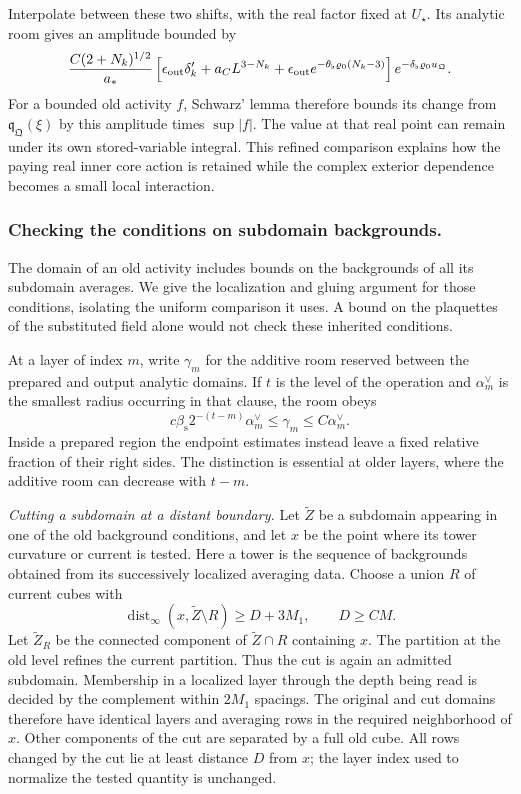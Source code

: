 \documentclass[11pt,letterpaper,reqno]{amsart}
\theoremstyle{definition}
\theoremstyle{remark}
\begin{document}
Interpolate between these two shifts, with the real
factor fixed at \(U_\star\). Its analytic room gives
an amplitude bounded by
\begin{equation}\label{eq:anchor-stored-comparison-amplitude}
 \frac{C(2+N_k)^{1/2}}{a_*}
 \left[
  \epsilon_{\rm out}\delta'_k+
  a_CL^{3-N_k}
  +\epsilon_{\rm out}e^{-\theta_\flat\varrho_0(N_k-3)}
 \right]e^{-\delta_\flat\varrho_0u_{\mathfrak Q}}.
\end{equation}
For a bounded old activity \(f\), Schwarz' lemma
therefore bounds its change from
\(\mathfrak q_{\mathfrak Q}(\xi)\) by this amplitude
times \(\sup|f|\). The value at that real point can
remain under its own stored-variable integral.
This refined comparison explains how the paying
real inner core action is retained while the
complex exterior dependence becomes a small local
interaction.

\subsubsection*{Checking the conditions on subdomain backgrounds.}

The domain of an old activity includes bounds on the backgrounds
of all its subdomain averages. We give the localization and gluing
argument for those conditions, isolating the uniform comparison it
uses. A bound on the plaquettes of the substituted field alone
would not check these inherited conditions.

At a layer of index $m$, write $\gamma_m$ for the additive room
reserved between the prepared and output analytic domains. If $t$
is the level of the operation and $\alpha_m^\vee$ is the smallest
radius occurring in that clause, the room obeys
\[
 c\beta_{\mathrm s}2^{-(t-m)}\alpha_m^\vee
                      \le\gamma_m\le C\alpha_m^\vee.
\]
Inside a prepared region the endpoint estimates instead leave a
fixed relative fraction of their right sides. The distinction is
essential at older layers, where the additive room can decrease
with $t-m$.

\emph{Cutting a subdomain at a distant boundary.}
Let $\widetilde Z$ be a subdomain appearing in one of the old
background conditions, and let $x$ be the point where its tower
curvature or current is tested. Here a tower is the sequence of
backgrounds obtained from its successively localized averaging
data. Choose a union $R$ of current cubes with
\[
 \operatorname{dist}_\infty(x,\widetilde Z\setminus R)
                               \ge D+3M_1,\qquad D\ge CM.
\]
Let $\widetilde Z_R$ be the connected component of
$\widetilde Z\cap R$ containing $x$. The partition at the old
level refines the current partition. Thus the cut is again an
admitted subdomain. Membership in a localized layer through the
depth being read is decided by the complement within $2M_1$
spacings. The original and cut domains therefore have identical
layers and averaging rows in the required neighborhood of $x$.
Other components of the cut are separated by a full old cube.
All rows changed by the cut lie at least distance $D$ from $x$;
the layer index used to normalize the tested quantity is unchanged.
\end{document}
